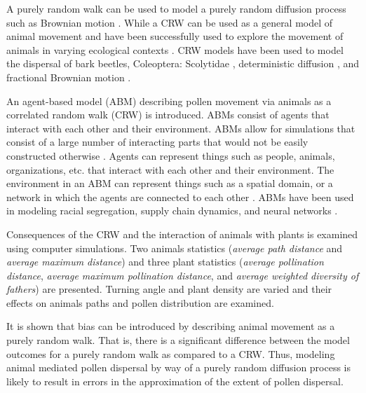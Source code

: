 A purely random walk can be used to model a purely random diffusion process such as Brownian motion
\cite{Codling}. While a CRW can be used as a general model of animal movement \cite{Prasad05} and
have been successfully used to explore the movement of animals in varying ecological contexts
\cite{Bartumeus07}. CRW models have been used to model the dispersal of bark beetles, Coleoptera:
Scolytidae \cite{Byers01}, deterministic diffusion \cite{Klages}, and fractional Brownian motion
\cite{Enriquez}.

An agent-based model (ABM) describing pollen movement via animals as a correlated random walk (CRW)
is introduced. ABMs consist of agents that interact with each other and their environment. ABMs
allow for simulations that consist of a large number of interacting parts that would not be easily
constructed otherwise \cite{Fioretti05}. Agents can represent things such as people, animals,
organizations, etc. that interact with each other and their environment. The environment in an ABM
can represent things such as a spatial domain, or a network in which the agents are connected to
each other \cite{Gilbert}. ABMs have been used in modeling racial segregation, supply chain
dynamics, and neural networks \cite{Gilbert}.

Consequences of the CRW and the interaction of animals with plants is examined using computer
simulations. Two animals statistics (\emph{average path distance} and \emph{average maximum
distance}) and three plant statistics (\emph{average pollination distance}, \emph{average maximum
pollination distance}, and \emph{average weighted diversity of fathers}) are presented. Turning
angle and plant density are varied and their effects on animals paths and pollen distribution are
examined.

It is shown that bias can be introduced by describing animal movement as a purely random walk. That
is, there is a significant difference between the model outcomes for a purely random walk as
compared to a CRW. Thus, modeling animal mediated pollen dispersal by way of a purely random
diffusion process is likely to result in errors in the approximation of the extent of pollen
dispersal.
